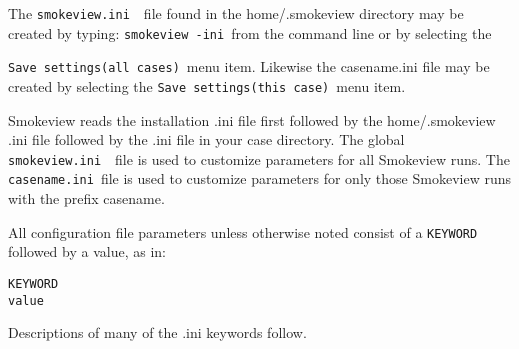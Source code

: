\documentclass[11pt,twoside]{book}
\newcommand{\svini}{{\tt smokeview.ini}\ }
\begin{document}
The \svini\ file found in the home/.smokeview directory may be created by typing:
{\tt smokeview -ini}\
from the command line or by selecting the {{\tt Save settings(all cases)}\ menu item.
Likewise the casename.ini file may be created by selecting the {\tt Save settings(this case)}\ menu item.

Smokeview reads the installation .ini file first followed by the home/.smokeview .ini file followed by the .ini file in your case directory.
The global \svini\ file is used to
customize parameters for all Smokeview runs. The {\tt casename.ini}\ file is
used to customize parameters for only those Smokeview runs with
the prefix casename.

All configuration file parameters unless otherwise noted consist of a {\tt KEYWORD}
followed by a value, as in:
\begin{lstlisting}
KEYWORD
value
\end{lstlisting}
Descriptions of many of the .ini keywords follow.





}
\end{document}

